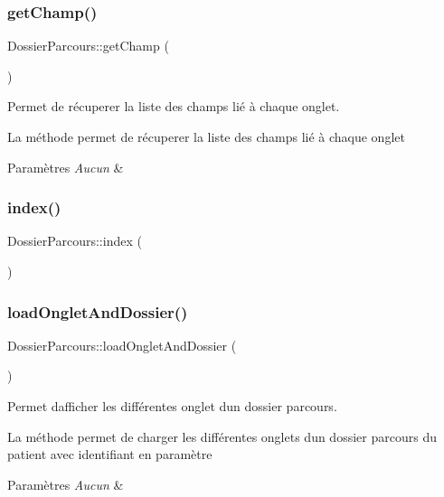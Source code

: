 \subsubsection{\texorpdfstring{get\+Champ()}{getChamp()}}
{\footnotesize\ttfamily Dossier\+Parcours\+::get\+Champ (\begin{DoxyParamCaption}{ }\end{DoxyParamCaption})}



Permet de récuperer la liste des champs lié à chaque onglet. 

La méthode permet de récuperer la liste des champs lié à chaque onglet 
\begin{DoxyParams}{Paramètres}
{\em Aucun} & \\
\hline
\end{DoxyParams}
\mbox{\label{class_dossier_parcours_a178d2bbd390067f69fff4313dec1c0eb}} 
\subsubsection{\texorpdfstring{index()}{index()}}
{\footnotesize\ttfamily Dossier\+Parcours\+::index (\begin{DoxyParamCaption}{ }\end{DoxyParamCaption})}

\mbox{\label{class_dossier_parcours_aa59c63d44b200a14541461a4c9f1746f}} 
\subsubsection{\texorpdfstring{load\+Onglet\+And\+Dossier()}{loadOngletAndDossier()}}
{\footnotesize\ttfamily Dossier\+Parcours\+::load\+Onglet\+And\+Dossier (\begin{DoxyParamCaption}{ }\end{DoxyParamCaption})}



Permet d\textquotesingle{}afficher les différentes onglet d\textquotesingle{}un dossier parcours. 

La méthode permet de charger les différentes onglets d\textquotesingle{}un dossier parcours du patient avec identifiant en paramètre 
\begin{DoxyParams}{Paramètres}
{\em Aucun} & \\
\hline
\end{DoxyParams}
\mbox{\label{class_dossier_parcours_a0749c88d27af59e143da827f8f1266d8}} 
